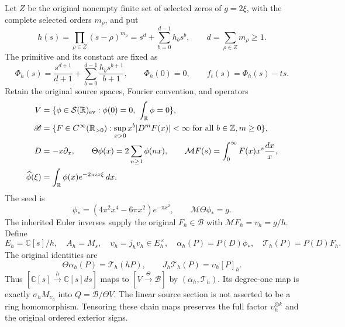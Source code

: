 \documentclass[11pt,a4paper]{article}
\newcommand{\C}{\mathbb C}
\newcommand{\BB}{\mathscr B}
\begin{document}
Let $Z$ be the original nonempty finite set of selected zeros of
$g=2\xi$, with the complete selected orders $m_\rho$, and put
\begin{equation}
 h(s)=\prod_{\rho\in Z}(s-\rho)^{m_\rho}
     =s^d+\sum_{b=0}^{d-1}h_bs^b,
 \qquad d=\sum_{\rho\in Z}m_\rho\ge1.
 \label{BC:eq:h}
\end{equation}
The primitive and its constant are fixed as
\begin{equation}
 \Phi_h(s)=\frac{s^{d+1}}{d+1}
       +\sum_{b=0}^{d-1}\frac{h_bs^{b+1}}{b+1},
 \qquad \Phi_h(0)=0,
 \qquad f_t(s)=\Phi_h(s)-ts.
 \label{BC:eq:phase}
\end{equation}
Retain the original source spaces, Fourier convention, and operators
\begin{align}
 V&=\{\phi\in\mathcal S(\mathbb R)_{\rm ev}:
          \phi(0)=0,\ \int_{\mathbb R}\phi=0\},\nonumber\\
 \BB&=\{F\in C^\infty(\mathbb R_{>0}):
      \sup_{x>0}x^b|D^mF(x)|<\infty
              \text{ for all }b\in\mathbb Z,m\ge0\},\nonumber\\
 D&=-x\partial_x,\qquad
 \Theta\phi(x)=2\sum_{n\ge1}\phi(nx),\qquad
 \mathcal MF(s)=\int_0^\infty F(x)x^s\frac{dx}{x},
 \label{BC:eq:source}\\
 \widehat\phi(\xi)&=\int_{\mathbb R}\phi(x)e^{-2\pi ix\xi}\,dx.
 \nonumber
\end{align}
The seed is
\begin{equation}
 \phi_*=(4\pi^2x^4-6\pi x^2)e^{-\pi x^2},
 \qquad \mathcal M\Theta\phi_*=g.
\end{equation}
The inherited Euler inverses supply the original $F_h\in\BB$ with
$\mathcal MF_h=v_h=g/h$.  Define
\begin{equation}
 E_h=\C[s]/h,\quad A_h=M_s,\quad
 \upsilon_h=j_hv_h\in E_h^\times,\quad
 \alpha_h(P)=P(D)\phi_*,\quad \mathcal T_h(P)=P(D)F_h.
 \label{BC:eq:maps}
\end{equation}
The original identities are
\begin{equation}
 \Theta\alpha_h(P)=\mathcal T_h(hP),\qquad
 J_h\mathcal T_h(P)=\upsilon_h[P]_h.
 \label{BC:eq:source-square}
\end{equation}
Thus $[\C[s]\xrightarrow{h}\C[s]ds]$ maps to
$[V\xrightarrow{\Theta}\BB]$ by $(\alpha_h,\mathcal T_h)$.
Its degree-one map is exactly $\sigma_hM_{\upsilon_h}$ into
$Q=\BB/\Theta V$.  The linear source section is not asserted to be a
ring homomorphism.  Tensoring these chain maps preserves the full factor
$\upsilon_h^{\otimes k}$ and the original ordered exterior signs.
\end{document}
